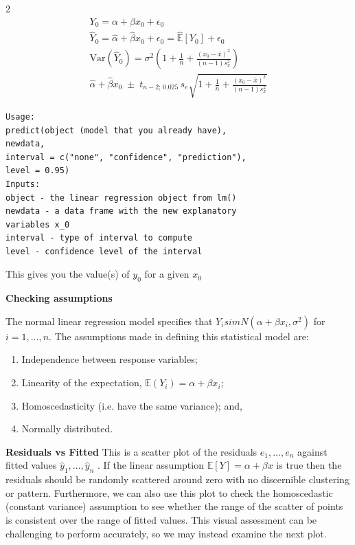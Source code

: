 \documentclass[10pt]{extarticle}
\theoremstyle{definition}
\theoremstyle{remark}
\newcommand{\E}{\mathbb{E}}
\begin{document}
\begin{multicols}{2}
    \begin{gather*}
        Y_0 = \alpha + \beta x_0 + \epsilon_0 \\
        \hat{Y}_0 = \hat{\alpha} + \hat{\beta}x_0 + \epsilon_0 = \hat{\mathbb{E}}[Y_0] + \epsilon_0 \\
        \text{Var}(\hat{Y}_0) = \sigma^2\!\left(1 + \frac{1}{n} + \frac{(x_0-\bar{x})^2}{(n-1)s_x^2}\right) \\
        \hat{\alpha} + \hat{\beta}x_0 \;\pm\; t_{n-2;\,0.025}\,s_e\sqrt{1 + \frac{1}{n} + \frac{(x_0-\bar{x})^2}{(n-1)s_x^2}}
    \end{gather*}

    \begin{verbatim}
Usage: 
predict(object (model that you already have), 
newdata, 
interval = c("none", "confidence", "prediction"),
level = 0.95)
Inputs: 
object - the linear regression object from lm()
newdata - a data frame with the new explanatory 
variables x_0
interval - type of interval to compute
level - confidence level of the interval
    \end{verbatim}
    This gives you the value(s) of $y_0$ for a given $x_0$

    \noindent 
    \textbf{Checking assumptions}

    The normal linear regression model specifies that $Y_i sim N (\alpha + \beta x_i , \sigma^2 )$ 
    for $i = 1, \ldots , n$. The assumptions made in defining this statistical
    model are:
    \begin{enumerate}
        \item Independence between response variables;
        \item Linearity of the expectation, $\E(Y_i ) = \alpha + \beta x_i$;
        \item Homoscedasticity (i.e. have the same variance); and,
        \item Normally distributed.
    \end{enumerate}

    \textbf{Residuals vs Fitted}
    This is a scatter plot of the residuals $e_1 , \ldots , e_n$ against fitted
    values $\hat{y}_1 , \ldots , \hat{y}_n$ . If the linear assumption $\E [Y ] = \alpha +
    \beta x$ is true
    then the residuals should be randomly scattered around zero with no
    discernible clustering or pattern. Furthermore, we can also use this plot
    to check the homoscedastic (constant variance) assumption to see whether
    the range of the scatter of points is consistent over the range of fitted
    values. This visual assessment can be challenging to perform accurately, so
    we may instead examine the next plot.


\end{multicols}
\end{document}
